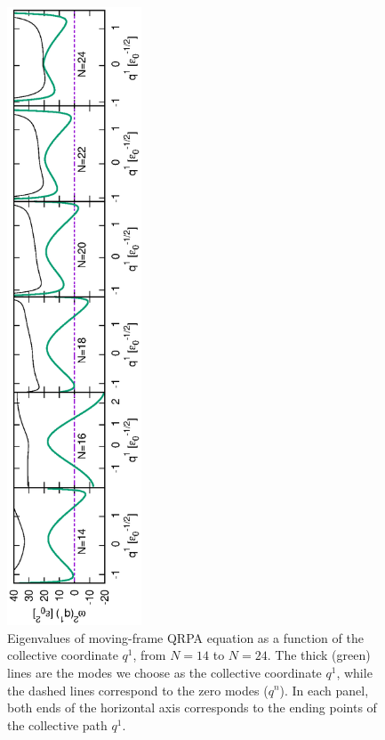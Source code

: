 \documentclass[%
superscriptaddress,
showpacs,
nofootinbib,
amsmath,amssymb,
aps,
prc,
twocolumn,
floatfix ]%
{revtex4-1}
\begin{document}
\begin{figure}[tb]
 \begin{center}
  \includegraphics[width=40mm,angle=-90]{omega_sq.eps}
 \end{center}
 \caption{Eigenvalues of moving-frame QRPA equation as a function of
the collective coordinate $q^1$, from $N=14$ to $N=24$.
The thick (green) lines are the modes we choose as
the collective coordinate $q^1$,
while the dashed lines correspond to the zero modes ($q^n$).
In each panel, both ends of the horizontal axis corresponds
to the ending points of the collective path $q^1$.
}
 \label{omega_sq}
\end{figure}
\end{document}
